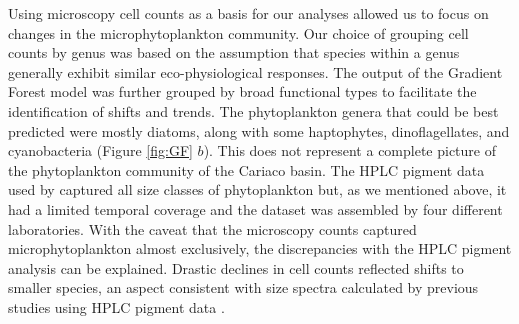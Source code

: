\documentclass[draft]{agujournal2019}
\begin{document}
    Using microscopy cell counts as a basis for our analyses allowed us to focus on changes in the microphytoplankton community. Our choice of grouping cell counts by genus was based on the assumption that species within a genus generally exhibit similar eco-physiological responses. The output of the Gradient Forest model was further grouped by broad functional types to facilitate the identification of shifts and trends. The phytoplankton genera that could be best predicted were mostly diatoms, along with some haptophytes, dinoflagellates, and cyanobacteria (Figure \ref{fig:GF} $b$). This does not represent a complete picture of the phytoplankton community of the Cariaco basin. The HPLC pigment data used by \citeauthor{pinckney_phytoplankton_2015} captured all size classes of phytoplankton but, as we mentioned above, it had a limited temporal coverage and the dataset was assembled by four different laboratories. With the caveat that the microscopy counts captured microphytoplankton almost exclusively, the discrepancies with the HPLC pigment analysis can be explained. Drastic declines in cell counts reflected shifts to smaller species, an aspect consistent with size spectra calculated by previous studies using HPLC pigment data \cite{lorenzoni_characterization_2015}.
    
\end{document}
